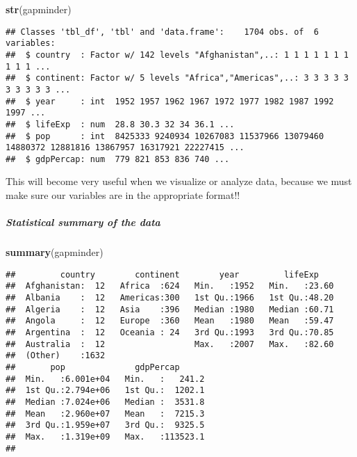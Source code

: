 \documentclass[]{article}
\newenvironment{Shaded}{\begin{snugshade}}{\end{snugshade}}
\newcommand{\KeywordTok}[1]{\textcolor[rgb]{0.13,0.29,0.53}{\textbf{#1}}}
\newcommand{\NormalTok}[1]{#1}
\let\oldsubparagraph\subparagraph
\renewcommand{\subparagraph}[1]{\oldsubparagraph{#1}\mbox{}}
\begin{document}
\begin{Shaded}
\begin{Highlighting}[]
\KeywordTok{str}\NormalTok{(gapminder)}
\end{Highlighting}
\end{Shaded}

\begin{verbatim}
## Classes 'tbl_df', 'tbl' and 'data.frame':    1704 obs. of  6 variables:
##  $ country  : Factor w/ 142 levels "Afghanistan",..: 1 1 1 1 1 1 1 1 1 1 ...
##  $ continent: Factor w/ 5 levels "Africa","Americas",..: 3 3 3 3 3 3 3 3 3 3 ...
##  $ year     : int  1952 1957 1962 1967 1972 1977 1982 1987 1992 1997 ...
##  $ lifeExp  : num  28.8 30.3 32 34 36.1 ...
##  $ pop      : int  8425333 9240934 10267083 11537966 13079460 14880372 12881816 13867957 16317921 22227415 ...
##  $ gdpPercap: num  779 821 853 836 740 ...
\end{verbatim}

This will become very useful when we visualize or analyze data, because
we must make sure our variables are in the appropriate format!!

\subparagraph{Statistical summary of the
data}\label{statistical-summary-of-the-data}

\begin{Shaded}
\begin{Highlighting}[]
\KeywordTok{summary}\NormalTok{(gapminder)}
\end{Highlighting}
\end{Shaded}

\begin{verbatim}
##         country        continent        year         lifeExp     
##  Afghanistan:  12   Africa  :624   Min.   :1952   Min.   :23.60  
##  Albania    :  12   Americas:300   1st Qu.:1966   1st Qu.:48.20  
##  Algeria    :  12   Asia    :396   Median :1980   Median :60.71  
##  Angola     :  12   Europe  :360   Mean   :1980   Mean   :59.47  
##  Argentina  :  12   Oceania : 24   3rd Qu.:1993   3rd Qu.:70.85  
##  Australia  :  12                  Max.   :2007   Max.   :82.60  
##  (Other)    :1632                                                
##       pop              gdpPercap       
##  Min.   :6.001e+04   Min.   :   241.2  
##  1st Qu.:2.794e+06   1st Qu.:  1202.1  
##  Median :7.024e+06   Median :  3531.8  
##  Mean   :2.960e+07   Mean   :  7215.3  
##  3rd Qu.:1.959e+07   3rd Qu.:  9325.5  
##  Max.   :1.319e+09   Max.   :113523.1  
## 
\end{verbatim}
\end{document}
